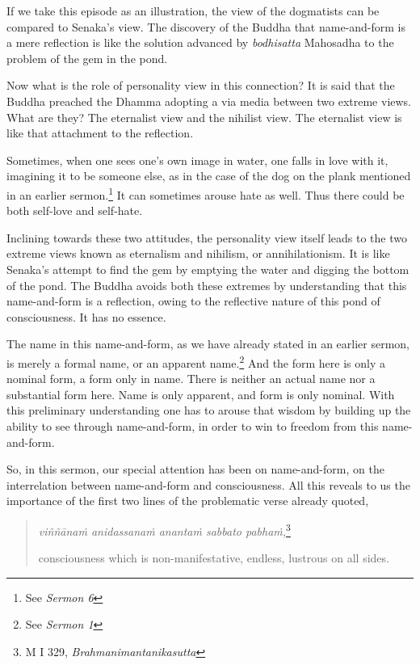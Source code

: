 \clearpage

If we take this episode as an illustration, the view of the dogmatists can be compared to Senaka's view. The discovery of the Buddha that name-and-form is a mere reflection is like the solution advanced by \emph{bodhisatta} Mahosadha to the problem of the gem in the pond.

Now what is the role of personality view in this connection? It is said that the Buddha preached the Dhamma adopting a via media between two extreme views. What are they? The eternalist view and the nihilist view. The eternalist view is like that attachment to the reflection.

Sometimes, when one sees one's own image in water, one falls in love with it, imagining it to be someone else, as in the case of the dog on the plank mentioned in an earlier sermon.\footnote{See \emph{Sermon 6}} It can sometimes arouse hate as well. Thus there could be both self-love and self-hate.

Inclining towards these two attitudes, the personality view itself leads to the two extreme views known as eternalism and nihilism, or annihilationism. It is like Senaka's attempt to find the gem by emptying the water and digging the bottom of the pond. The Buddha avoids both these extremes by understanding that this name-and-form is a reflection, owing to the reflective nature of this pond of consciousness. It has no essence.

The name in this name-and-form, as we have already stated in an earlier sermon, is merely a formal name, or an apparent name.\footnote{See \emph{Sermon 1}} And the form here is only a nominal form, a form only in name. There is neither an actual name nor a substantial form here. Name is only apparent, and form is only nominal. With this preliminary understanding one has to arouse that wisdom by building up the ability to see through name-and-form, in order to win to freedom from this name-and-form.

So, in this sermon, our special attention has been on name-and-form, on the interrelation between name-and-form and consciousness. All this reveals to us the importance of the first two lines of the problematic verse already quoted,

\clearpage

\begin{quote}
\emph{viññānaṁ anidassanaṁ anantaṁ sabbato pabhaṁ,}\footnote{M I 329, \emph{Brahmanimantanikasutta}}

consciousness which is non-manifestative, endless, lustrous on all sides.
\end{quote}

